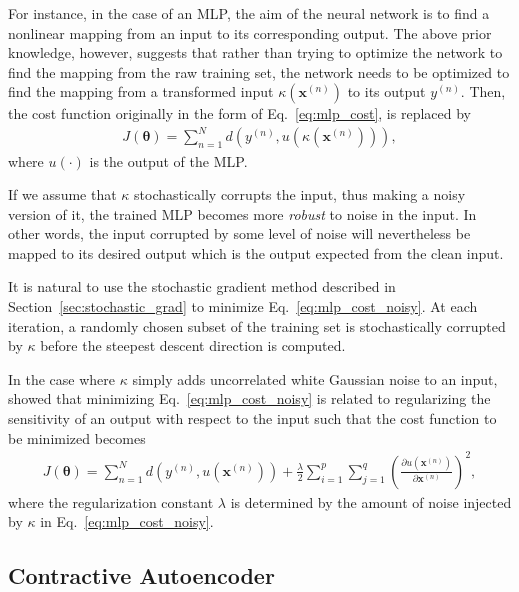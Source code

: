\documentclass[dissertation,nocontribution,draft*]{aaltoseries}
\newcommand{\vect}[1]{\mathbf{#1}}
\newcommand{\vects}[1]{\boldsymbol{#1}}
\newcommand{\vx}[0]{\vect{x}}
\newcommand{\TT}[0]{{\vects{\theta}}}
\begin{document}
For instance, in the case of an MLP, the aim of the neural
network is to find a nonlinear mapping from an input to its
corresponding output. The above prior knowledge, however,
suggests that rather than trying to optimize the network to
find the mapping from the raw training set, the network
needs to be optimized to find the mapping from a transformed
input $\kappa(\vx^{(n)})$ to its output $y^{(n)}$. Then, the
cost function originally in the form of
Eq.~\eqref{eq:mlp_cost}, is replaced by
\begin{align}
    \label{eq:mlp_cost_noisy}
    J(\TT) = \sum_{n=1}^N d\left(y^{(n)},
    u(\kappa(\vx^{(n)}))\right),
\end{align}
where $u(\cdot)$ is the output of the MLP.

If we assume that $\kappa$ stochastically corrupts the
input,
thus making a noisy version of it, the trained MLP becomes
more \textit{robust} to noise in the input. In other words,
the input corrupted by some level of noise will nevertheless
be mapped to its desired output which is the output expected
from the clean input. 

It is natural to use the stochastic gradient method
described in Section~\ref{sec:stochastic_grad} to minimize
Eq.~\eqref{eq:mlp_cost_noisy}. At each iteration, a randomly
chosen subset of the training set is stochastically
corrupted by $\kappa$ before the steepest descent direction
is computed. 

In the case where $\kappa$ simply adds uncorrelated white
Gaussian noise to an input, \citet{Bishop1995} showed that
minimizing Eq.~\eqref{eq:mlp_cost_noisy} is related to
regularizing the sensitivity of an output with respect to
the input such that the cost function to be minimized
becomes
\begin{align}
    \label{eq:noise_injection_reg}
    J(\TT) = \sum_{n=1}^N d\left(y^{(n)},
    u(\vx^{(n)})\right) + \frac{\lambda}{2}
    \sum_{i=1}^p \sum_{j=1}^q \left( \frac{\partial
    u(\vx^{(n)})}{\partial \vx^{(n)}}\right)^2,
\end{align}
where the regularization constant $\lambda$ is determined by
the amount of noise injected by $\kappa$ in
Eq.~\eqref{eq:mlp_cost_noisy}.

\subsection{Contractive Autoencoder}
\end{document}
